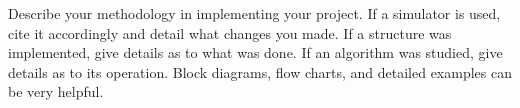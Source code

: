 Describe your methodology in implementing your project. If a simulator is used,
cite it accordingly and detail what changes you made. If a structure was implemented, give details
as to what was done. If an algorithm was studied, give details as to its
operation. Block diagrams,
flow charts, and detailed examples can be very helpful. 

\blindtext
